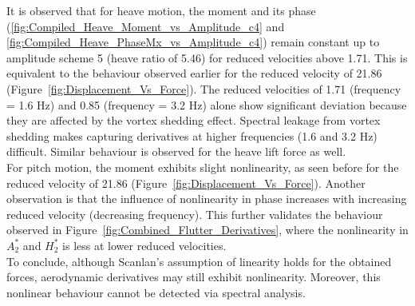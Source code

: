 \documentclass[../main]{subfiles}
\begin{document}
It is observed that for heave motion, the moment and its phase (\ref{fig:Compiled_Heave_Moment_vs_Amplitude_c4} and \ref{fig:Compiled_Heave_PhaseMx_vs_Amplitude_c4}) remain constant up to amplitude scheme 5 (heave ratio of 5.46) 
for reduced velocities above 1.71. This is equivalent to the behaviour observed earlier for the reduced velocity of 21.86 
(Figure~\ref{fig:Displacement_Vs_Force}). The reduced velocities of 1.71 (frequency = 1.6 Hz) and 0.85 (frequency = 3.2 Hz) alone show significant deviation 
because they are affected by the vortex shedding effect. Spectral leakage from vortex shedding makes capturing derivatives at 
higher frequencies (1.6 and 3.2 Hz) difficult. Similar behaviour is observed for the heave lift force as well. \\

For pitch motion, the moment exhibits slight nonlinearity, as seen before for the reduced velocity of 21.86 (Figure~\ref{fig:Displacement_Vs_Force}). 
Another observation is that the influence of nonlinearity in phase increases with increasing reduced velocity (decreasing frequency). This further validates 
the behaviour observed in Figure~\ref{fig:Combined_Flutter_Derivatives}, 
where the nonlinearity in $A_2^*$ and $H_2^*$ is less at lower reduced velocities. \\

To conclude, although Scanlan's assumption of linearity holds for the 
obtained forces, aerodynamic derivatives may still exhibit nonlinearity. Moreover, this 
nonlinear behaviour cannot be detected via spectral analysis. \\
\end{document}
